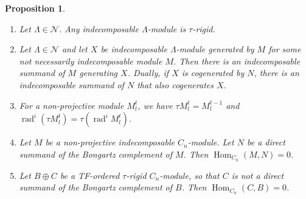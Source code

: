 \documentclass[11pt]{amsart}
\DeclareMathOperator{\Hom}{\mathrm{Hom}}
\DeclareMathOperator{\rad}{\mathrm{rad}}
\newtheorem{proposition}[theorem]{Proposition}
\theoremstyle{definition}
\begin{document}
\begin{proposition}\label{prop:nakayama_cn_properties}
    
    \begin{enumerate}
        \item Let $\Lambda \in \mathcal{N}$. Any indecomposable $\Lambda$-module is $\tau$-rigid.
        \item Let $\Lambda \in \mathcal{N}$ and let $X$ be indecomposable $\Lambda$-module generated by $M$ for some not necessarily indecomposable module $M$. Then there is an indecomposable summand of $M$ generating $X$. Dually, if $X$ is cogenerated by $N$, there is an indecomposable summand of $N$ that also cogenerates $X$.
        \item For a non-projective module $M^t_l$, we have $\tau M^t_l = M^{t-1}_l$ and $\rad^i (\tau M^t_l)= \tau(\rad^i M^t_l)$.
        \item Let $M$ be a non-projective indecomposable $C_n$-module. Let $N$ be a direct summand of the Bongartz complement of $M$. Then $\Hom_{C_n}(M,N) = 0$.
        \item Let $B \oplus C$ be a TF-ordered $\tau$-rigid $C_n$-module, so that $C$ is not a direct summand of the Bongartz complement of $B$. Then $\Hom_{C_n}(C,B) = 0$.
    \end{enumerate}
\end{proposition}
\end{document}
